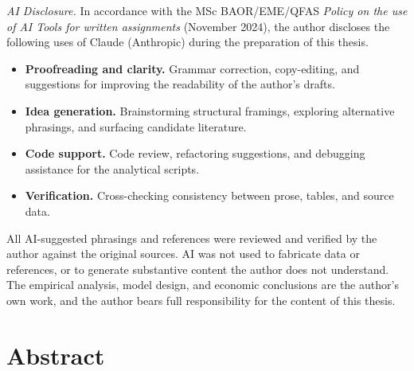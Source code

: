 \documentclass[12pt, a4paper]{article}
\begin{document}
\noindent\textit{AI Disclosure.} In accordance with the MSc BAOR/EME/QFAS \emph{Policy on the use of AI Tools for written assignments} (November 2024), the author discloses the following uses of Claude (Anthropic) during the preparation of this thesis.
\begin{itemize}
    \item \textbf{Proofreading and clarity.} Grammar correction, copy-editing, and suggestions for improving the readability of the author's drafts.
    \item \textbf{Idea generation.} Brainstorming structural framings, exploring alternative phrasings, and surfacing candidate literature.
    \item \textbf{Code support.} Code review, refactoring suggestions, and debugging assistance for the analytical scripts.
    \item \textbf{Verification.} Cross-checking consistency between prose, tables, and source data.
\end{itemize}
All AI-suggested phrasings and references were reviewed and verified by the author against the original sources. AI was not used to fabricate data or references, or to generate substantive content the author does not understand. The empirical analysis, model design, and economic conclusions are the author's own work, and the author bears full responsibility for the content of this thesis.

\newpage

\section*{Abstract}
\end{document}
